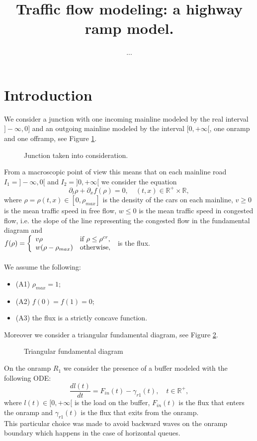 \documentclass[12pt,subeqn]{article}
\numberwithin{equation}{section}
\newcommand{\R}{\mathbb R}
\newcommand{\del}{\partial}
\newcommand{\be}{\begin{equation}}
\newcommand{\ee}{\end{equation}}
\begin{document}
\title{Traffic flow modeling: a highway ramp model.}
\author{...}

\maketitle

\section{Introduction}
We consider a junction with one incoming mainline modeled by the real interval $]-\infty,0]$ and an outgoing mainline modeled by the interval $[0,+\infty[$, one onramp and one offramp, see Figure \ref{fig:junction}.
\begin{figure}[H]
\centering

\caption{Junction taken into consideration.}
\label{fig:junction}
\end{figure}
From a macroscopic point of view this means that on each mainline road $I_1=]-\infty ,0[$ and $I_2=]0,+\infty [$ we consider the equation
\be
	\del_t \rho + \del_x f(\rho) =0, \quad  (t,x)\in\R^+\times\R, 
	\label{eq:LWR}
\ee
where $\rho=\rho(t,x) \in [0, \rho_{max}]$ is the density of the cars on each mainline, $v \geq 0$ is the mean traffic speed in free flow, $w\leq 0$ is the mean traffic speed in congested flow, i.e. the slope of the line representing the congested flow in the fundamental diagram and \\ $f(\rho) =
	\left\{
	\begin{array}{ll}
		v\rho &\hbox{if}~\rho\leq\rho^{cr} , \\
		w(\rho-\rho_{max}) &\hbox{otherwise},
	\end{array}
	\right.$ \quad is the flux.\\ \\
We assume the following:
\begin{itemize}
	\item[] (A1) $\rho_{max}=1$;
	\item[] (A2) $f(0)=f(1)=0$;
	\item[] (A3) the flux is a strictly concave function.
\end{itemize}
Moreover we consider a triangular fundamental diagram, see Figure \ref{fig:FDiag}.
\begin{figure}[H]
\centering

\caption{Triangular fundamental diagram}
\label{fig:FDiag}
\end{figure}

On the onramp $R_1$ we consider the presence of a buffer modeled with the following ODE:
\be
	\dfrac{dl(t)}{dt}=F_{in}(t)-\gamma_{r1}(t), \quad t\in\R^+ ,
	\label{eq:ODEonramp}
\ee
where $l(t) \in [0, +\infty[$ is the load on the buffer, $F_{in}(t)$ is the flux that enters the onramp and $\gamma_{r1}(t)$ is the flux that exits from the onramp. \\
This particular choice was made to avoid backward waves on the onramp boundary which happens in the case of horizontal queues.
\end{document}
